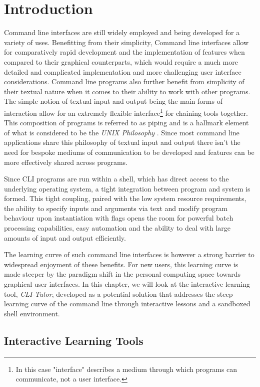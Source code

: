 \chapter{Introduction}
\label{chap:intro}

Command line interfaces are still widely employed and being developed for a
variety of uses. Benefitting from their simplicity, Command line interfaces
allow for comparatively rapid development and the implementation of features
when compared to their graphical counterparts, which would require a much more
detailed and complicated implementation and more challenging user interface
considerations. Command line programs also further benefit from simplicity of
their textual nature when it comes to their ability to work with other
programs. The simple notion of textual input and output being the main forms of
interaction allow for an extremely flexible interface\footnote{In this case
	"interface" describes a medium through which programs can communicate, not
	a user interface.} for chaining tools together. This composition of
programs is referred to as piping and is a hallmark element of what is
considered to be the \textit{UNIX Philosophy} \cite{mcilroy1978unix}. Since
most command line applications share this philosophy of textual input and output
there isn't the need for bespoke mediums of communication to be developed and
features can be more effectively shared across programs.

Since CLI programs are run within a shell, which has direct access to the
underlying operating system, a tight integration between program and system is
formed. This tight coupling, paired with the low system resource requirements,
the ability to specify inputs and arguments via text and modify program
behaviour upon instantiation with flags opens the room for powerful batch
processing capabilities, easy automation and the ability to deal with large
amounts of input and output efficiently.

The learning curve of such command line interfaces is however a strong barrier
to widespread enjoyment of these benefits. For new users, this learning curve
is made steeper by the paradigm shift in the personal computing space towards
graphical user interfaces. In this chapter, we will look at the interactive
learning tool, \textit{CLI-Tutor}, developed as a potential solution that
addresses the steep learning curve of the command line through interactive
lessons and a sandboxed shell environment.


\section{Interactive Learning Tools}

